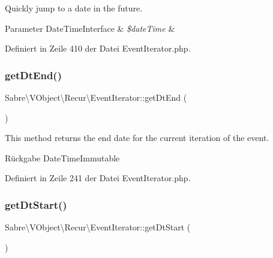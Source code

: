 Quickly jump to a date in the future.


\begin{DoxyParams}[1]{Parameter}
Date\+Time\+Interface & {\em \$date\+Time} & \\
\hline
\end{DoxyParams}


Definiert in Zeile 410 der Datei Event\+Iterator.\+php.

\mbox{\label{class_sabre_1_1_v_object_1_1_recur_1_1_event_iterator_a973cbb7f6c8b387b8130c5e3ee445fdc}} 
\subsubsection{\texorpdfstring{get\+Dt\+End()}{getDtEnd()}}
{\footnotesize\ttfamily Sabre\textbackslash{}\+V\+Object\textbackslash{}\+Recur\textbackslash{}\+Event\+Iterator\+::get\+Dt\+End (\begin{DoxyParamCaption}{ }\end{DoxyParamCaption})}

This method returns the end date for the current iteration of the event.

\begin{DoxyReturn}{Rückgabe}
Date\+Time\+Immutable 
\end{DoxyReturn}


Definiert in Zeile 241 der Datei Event\+Iterator.\+php.

\mbox{\label{class_sabre_1_1_v_object_1_1_recur_1_1_event_iterator_ad93a1a5cf2a2ec68f8f3e17e88594159}} 
\subsubsection{\texorpdfstring{get\+Dt\+Start()}{getDtStart()}}
{\footnotesize\ttfamily Sabre\textbackslash{}\+V\+Object\textbackslash{}\+Recur\textbackslash{}\+Event\+Iterator\+::get\+Dt\+Start (\begin{DoxyParamCaption}{ }\end{DoxyParamCaption})}

